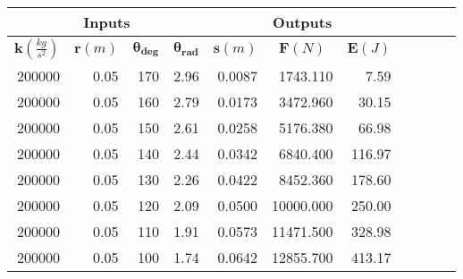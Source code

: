 \begin{tabular}{| r | r | r | r || r | r | r | r | r | r | r |}
	\hline
	\multicolumn{4}{|c||}{\bf Inputs} & \multicolumn{3}{|c|}{\bf Outputs} \\ \hline	
	\multicolumn{1}{|c|}{$\mathbf{k} (\frac{kg}{s^2})$}       & \multicolumn{1}{|c|}{$\mathbf{r} (m)$}     & \multicolumn{1}{|c|}{$\mathbf{\theta_{deg}}$} & \multicolumn{1}{|c||}{$\mathbf{\theta_{rad}}$} & \multicolumn{1}{|c|}{$\mathbf{s} (m)$}       & \multicolumn{1}{|c|}{$\mathbf{F} (N)$}       & \multicolumn{1}{|c|}{$\mathbf{E} (J)$}       \\ \hline %
	200000  & 0.05  & 170            & 2.96           & 0.0087  & 1743.110  & 7.59    \\ \hline %
	200000  & 0.05  & 160            & 2.79           & 0.0173  & 3472.960  & 30.15   \\ \hline %
	200000  & 0.05  & 150            & 2.61           & 0.0258  & 5176.380  & 66.98   \\ \hline %
	200000  & 0.05  & 140            & 2.44           & 0.0342  & 6840.400  & 116.97  \\ \hline %
	200000  & 0.05  & 130            & 2.26           & 0.0422  & 8452.360  & 178.60  \\ \hline %
	200000  & 0.05  & 120            & 2.09           & 0.0500  & 10000.000 & 250.00  \\ \hline %
	200000  & 0.05  & 110            & 1.91           & 0.0573  & 11471.500 & 328.98  \\ \hline %
	200000  & 0.05  & 100            & 1.74           & 0.0642  & 12855.700 & 413.17  \\ \hline %

\end{tabular}
